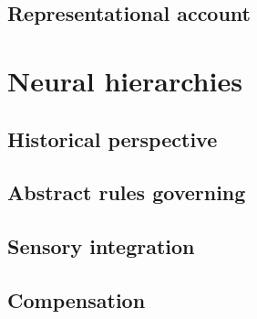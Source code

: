 \cite{McVayJOEP2009}
\cite{MrazekJoEP2012}
\cite{Weissman2006}

\cite{Killingsworth2010}
\cite{Smallwood2007}

\subsection{Representational account}

\cite{Binder2009}
\cite{Gusnard2001}

\cite{Smallwood2016}
\cite{Karapanagiotidis2017}

\cite{Schooler2011}
\cite{Buckner2013}


\section{Neural hierarchies}

\subsection{Historical perspective}
\cite{Kanwisher2010}
\cite{Sporns2014}
\cite{Mittner2016}
\cite{SmallwoodFrontiers2013}
\cite{Margulies2016}

\subsection{Abstract rules governing}
\cite{Duncan2010}
\cite{Fox2005}
\cite{Weissman2006}

\subsection{Sensory integration}
\cite{Mesulam1998}
\cite{Villena-Gonzalez2018}
\cite{Murphy2018}
\cite{VatanseverPNAS2017}

\subsection{Compensation}
\cite{VatanseverPNAS2017}
\cite{Crittenden2015}
\cite{Crittenden2016}



